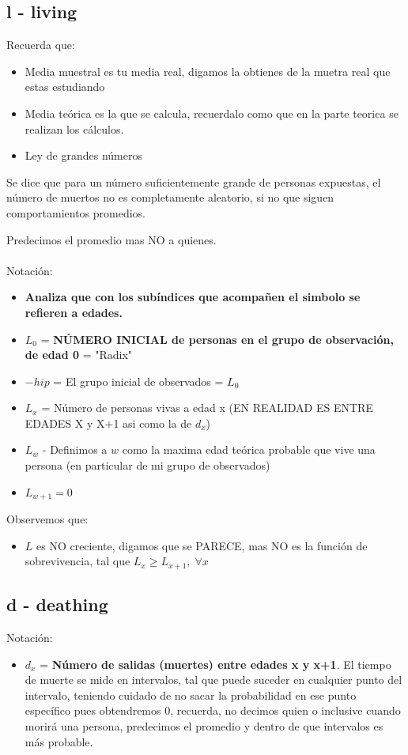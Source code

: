 \documentclass{article}
\begin{document}
\subsection*{l - living}
Recuerda que:
\begin{itemize}
    \item Media muestral es tu media real, digamos la obtienes de la muetra real que estas estudiando
    \item Media teórica es la que se calcula, recuerdalo como que en la parte teorica se realizan los cálculos.
    \item Ley de grandes números
\end{itemize}
Se dice que para un número suficientemente grande de personas expuestas, el número de muertos no es completamente aleatorio, si no que siguen comportamientos promedios.

Predecimos el promedio mas NO a quienes.
\\\\
Notación:
\begin{itemize}
    \item \textbf{Analiza que con los subíndices que acompañen el simbolo se refieren a edades.}
    \item \(L_0\) = \textbf{NÚMERO INICIAL de personas en el grupo de observación, de edad 0} = "Radix"
    \item \(-hip\) = El grupo inicial de observados = \(L_0\)
    \item \(L_x\) = Número de personas vivas a edad x (EN REALIDAD ES ENTRE EDADES X y X+1 asi como la de \(d_x\))
    \item \(L_w\) - Definimos a \(w\) como la maxima edad teórica probable que vive una persona (en particular de mi grupo de observados)
    \item \(L_{w+1} = 0\)
\end{itemize}
Observemos que:
\begin{itemize}
    \item \(L\) es NO creciente, digamos que se PARECE, mas NO es la función de sobrevivencia, tal que \(L_x \geq L_{x+1},\;\forall x\)
\end{itemize}

\subsection*{d - deathing}
Notación:
\begin{itemize}
    \item \(d_x\) = \textbf{Número de salidas (muertes) entre edades x y x+1}. El tiempo de muerte se mide en intervalos, tal que puede suceder en cualquier punto del intervalo, teniendo cuidado de no sacar la probabilidad en ese punto específico pues obtendremos 0, recuerda, no decimos quien o inclusive cuando morirá una persona, predecimos el promedio y dentro de que intervalos es más probable.
\end{itemize}
\end{document}
